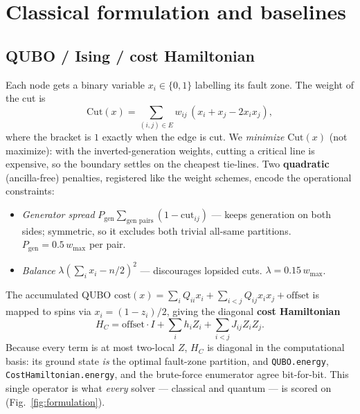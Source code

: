 \documentclass[10pt]{article}
\begin{document}
\section{Classical formulation and baselines}

\subsection{QUBO / Ising / cost Hamiltonian}
Each node gets a binary variable $x_i\in\{0,1\}$ labelling its fault zone. The
weight of the cut is
\[
\mathrm{Cut}(x)=\sum_{(i,j)\in E} w_{ij}\,(x_i+x_j-2x_ix_j),
\]
where the bracket is $1$ exactly when the edge is cut. We \emph{minimize}
$\mathrm{Cut}(x)$ (not maximize): with the inverted-generation weights, cutting a
critical line is expensive, so the boundary settles on the cheapest tie-lines.
Two \textbf{quadratic} (ancilla-free) penalties, registered like the weight
schemes, encode the operational constraints:
\begin{itemize}
  \item \emph{Generator spread} $P_{\text{gen}}\sum_{\text{gen pairs}}(1-\text{cut}_{ij})$
        --- keeps generation on both sides; symmetric, so it excludes both
        trivial all-same partitions. $P_{\text{gen}}=0.5\,w_{\max}$ per pair.
  \item \emph{Balance} $\lambda(\sum_i x_i-n/2)^2$ --- discourages lopsided
        cuts. $\lambda=0.15\,w_{\max}$.
\end{itemize}
The accumulated QUBO $\mathrm{cost}(x)=\sum_i Q_{ii}x_i+\sum_{i<j}Q_{ij}x_ix_j+
\text{offset}$ is mapped to spins via $x_i=(1-z_i)/2$, giving the diagonal
\textbf{cost Hamiltonian}
\[
H_C=\text{offset}\cdot I+\sum_i h_i Z_i+\sum_{i<j}J_{ij}Z_iZ_j .
\]
Because every term is at most two-local $Z$, $H_C$ is diagonal in the
computational basis: its ground state \emph{is} the optimal fault-zone
partition, and \texttt{QUBO.energy}, \texttt{CostHamiltonian.energy}, and the
brute-force enumerator agree bit-for-bit. This single operator is what
\emph{every} solver --- classical and quantum --- is scored on
(Fig.~\ref{fig:formulation}).
\end{document}
